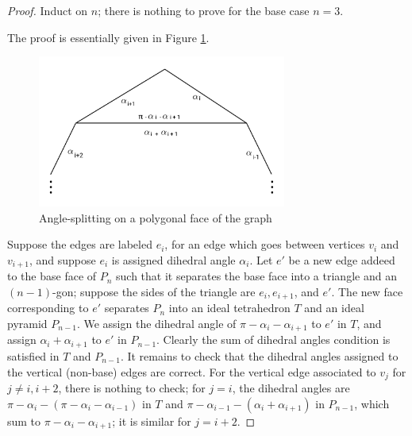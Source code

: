 \documentclass[11pt]{amsart}
\theoremstyle{plain}
\theoremstyle{definition}
\begin{document}
\begin{proof}
Induct on $n$; there is nothing to prove for the base case $n=3$.

The proof is essentially given in Figure \ref{f:ideal_pyramid_arg}.

\begin{figure}
\includegraphics[height=5cm]{more_pictures/angle_split.png}
\caption{Angle-splitting on a polygonal face of the graph}
\label{f:ideal_pyramid_arg}
\end{figure}


Suppose the edges are labeled $e_i$, for an edge
which goes between vertices $v_i$ and $v_{i+1}$,
and suppose $e_i$ is assigned dihedral angle $\alpha_i$.
Let $e'$ be a new edge addeed to the base face of $P_n$
such that it separates the base face into a triangle and
an $(n-1)$-gon;
suppose the sides of the triangle are
$e_i, e_{i+1}$, and $e'$.
The new face corresponding to $e'$ separates $P_n$ into
an ideal tetrahedron $T$ and an ideal pyramid $P_{n-1}$.
We assign the dihedral angle of $\pi - \alpha_i - \alpha_{i+1}$
to $e'$ in $T$, and assign $\alpha_i + \alpha_{i+1}$ to $e'$ in $P_{n-1}$.
Clearly the sum of dihedral angles condition is satisfied
in $T$ and $P_{n-1}$.
It remains to check that the dihedral angles assigned to the vertical (non-base)
edges are correct.
For the vertical edge associated to $v_j$ for $j \neq i, i+2$,
there is nothing to check;
for $j = i$, the dihedral angles are
$\pi - \alpha_i - (\pi - \alpha_i - \alpha_{i-1})$
in $T$ and $\pi - \alpha_{i-1} - (\alpha_i + \alpha_{i+1})$ in $P_{n-1}$,
which sum to $\pi - \alpha_i - \alpha_{i+1}$;
it is similar for $j = i+2$.

\end{proof}


\end{document}
